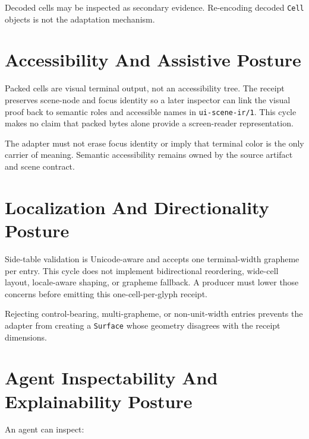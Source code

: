 Decoded cells may be inspected as secondary evidence. Re-encoding decoded \texttt{C\allowbreak{}e\allowbreak{}l\allowbreak{}l} objects is not the adaptation mechanism.

\section{Accessibility And Assistive Posture}\label{record-164-accessibility-and-assistive-posture}

Packed cells are visual terminal output, not an accessibility tree. The receipt preserves scene-node and focus identity so a later inspector can link the visual proof back to semantic roles and accessible names in \texttt{u\allowbreak{}i\allowbreak{}-\allowbreak{}s\allowbreak{}c\allowbreak{}e\allowbreak{}n\allowbreak{}e\allowbreak{}-\allowbreak{}i\allowbreak{}r\allowbreak{}/\allowbreak{}1}. This cycle makes no claim that packed bytes alone provide a screen-reader representation.

The adapter must not erase focus identity or imply that terminal color is the only carrier of meaning. Semantic accessibility remains owned by the source artifact and scene contract.

\section{Localization And Directionality Posture}\label{record-164-localization-and-directionality-posture}

Side-table validation is Unicode-aware and accepts one terminal-width grapheme per entry. This cycle does not implement bidirectional reordering, wide-cell layout, locale-aware shaping, or grapheme fallback. A producer must lower those concerns before emitting this one-cell-per-glyph receipt.

Rejecting control-bearing, multi-grapheme, or non-unit-width entries prevents the adapter from creating a \texttt{S\allowbreak{}u\allowbreak{}r\allowbreak{}f\allowbreak{}a\allowbreak{}c\allowbreak{}e} whose geometry disagrees with the receipt dimensions.

\section{Agent Inspectability And Explainability Posture}\label{record-164-agent-inspectability-and-explainability-posture}

An agent can inspect:

